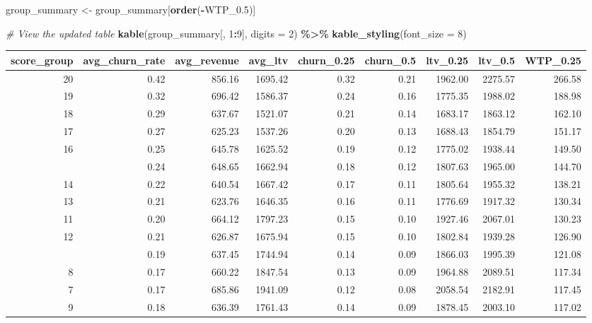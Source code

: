 \documentclass[
]{article}
\newenvironment{Shaded}{\begin{snugshade}}{\end{snugshade}}
\newcommand{\AttributeTok}[1]{\textcolor[rgb]{0.13,0.29,0.53}{#1}}
\newcommand{\CommentTok}[1]{\textcolor[rgb]{0.56,0.35,0.01}{\textit{#1}}}
\newcommand{\DecValTok}[1]{\textcolor[rgb]{0.00,0.00,0.81}{#1}}
\newcommand{\FloatTok}[1]{\textcolor[rgb]{0.00,0.00,0.81}{#1}}
\newcommand{\FunctionTok}[1]{\textcolor[rgb]{0.13,0.29,0.53}{\textbf{#1}}}
\newcommand{\NormalTok}[1]{#1}
\newcommand{\OtherTok}[1]{\textcolor[rgb]{0.56,0.35,0.01}{#1}}
\newcommand{\SpecialCharTok}[1]{\textcolor[rgb]{0.81,0.36,0.00}{\textbf{#1}}}
\begin{document}
\begin{Shaded}
\begin{Highlighting}[]
\NormalTok{group\_summary }\OtherTok{\textless{}{-}}\NormalTok{ group\_summary[}\FunctionTok{order}\NormalTok{(}\SpecialCharTok{{-}}\NormalTok{WTP\_0}\FloatTok{.5}\NormalTok{)]}

\CommentTok{\# View the updated table}
\FunctionTok{kable}\NormalTok{(group\_summary[, }\DecValTok{1}\SpecialCharTok{:}\DecValTok{9}\NormalTok{], }\AttributeTok{digits =} \DecValTok{2}\NormalTok{) }\SpecialCharTok{\%\textgreater{}\%}
  \FunctionTok{kable\_styling}\NormalTok{(}\AttributeTok{font\_size =} \DecValTok{8}\NormalTok{) }
\end{Highlighting}
\end{Shaded}

\begingroup\fontsize{8}{10}\selectfont

\begin{longtable}[t]{rrrrrrrrr}
\toprule
score\_group & avg\_churn\_rate & avg\_revenue & avg\_ltv & churn\_0.25 & churn\_0.5 & ltv\_0.25 & ltv\_0.5 & WTP\_0.25\\
\midrule
20 & 0.42 & 856.16 & 1695.42 & 0.32 & 0.21 & 1962.00 & 2275.57 & 266.58\\
19 & 0.32 & 696.42 & 1586.37 & 0.24 & 0.16 & 1775.35 & 1988.02 & 188.98\\
18 & 0.29 & 637.67 & 1521.07 & 0.21 & 0.14 & 1683.17 & 1863.12 & 162.10\\
17 & 0.27 & 625.23 & 1537.26 & 0.20 & 0.13 & 1688.43 & 1854.79 & 151.17\\
16 & 0.25 & 645.78 & 1625.52 & 0.19 & 0.12 & 1775.02 & 1938.44 & 149.50\\
\addlinespace
15 & 0.24 & 648.65 & 1662.94 & 0.18 & 0.12 & 1807.63 & 1965.00 & 144.70\\
14 & 0.22 & 640.54 & 1667.42 & 0.17 & 0.11 & 1805.64 & 1955.32 & 138.21\\
13 & 0.21 & 623.76 & 1646.35 & 0.16 & 0.11 & 1776.69 & 1917.32 & 130.34\\
11 & 0.20 & 664.12 & 1797.23 & 0.15 & 0.10 & 1927.46 & 2067.01 & 130.23\\
12 & 0.21 & 626.87 & 1675.94 & 0.15 & 0.10 & 1802.84 & 1939.28 & 126.90\\
\addlinespace
10 & 0.19 & 637.45 & 1744.94 & 0.14 & 0.09 & 1866.03 & 1995.39 & 121.08\\
8 & 0.17 & 660.22 & 1847.54 & 0.13 & 0.09 & 1964.88 & 2089.51 & 117.34\\
7 & 0.17 & 685.86 & 1941.09 & 0.12 & 0.08 & 2058.54 & 2182.91 & 117.45\\
9 & 0.18 & 636.39 & 1761.43 & 0.14 & 0.09 & 1878.45 & 2003.10 & 117.02\\

\end{longtable}
\end{document}
